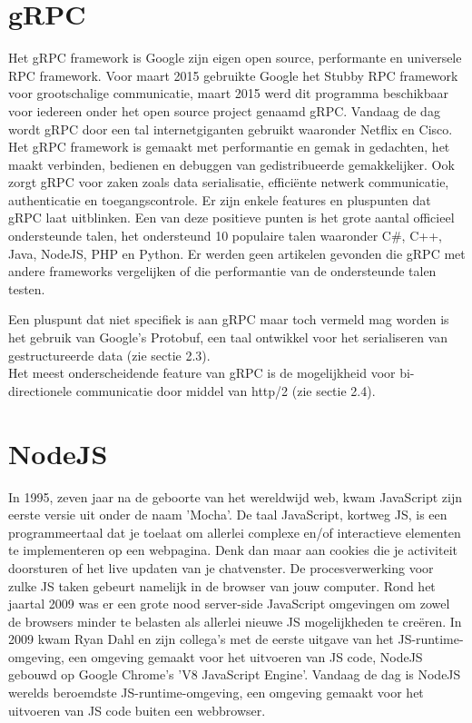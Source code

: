 \section{gRPC}
Het gRPC framework is Google zijn eigen open source, performante en universele RPC framework. Voor maart 2015 gebruikte Google het Stubby RPC framework voor grootschalige communicatie, maart 2015 werd dit programma beschikbaar voor iedereen onder het open source project genaamd gRPC. 
Vandaag de dag wordt gRPC door een tal internetgiganten gebruikt waaronder Netflix en Cisco.
Het gRPC framework is gemaakt met performantie en gemak in gedachten, het maakt verbinden, bedienen en debuggen van gedistribueerde gemakkelijker. Ook zorgt gRPC voor zaken zoals data serialisatie, efficiënte netwerk communicatie, authenticatie en toegangscontrole. Er zijn enkele features en pluspunten dat gRPC laat uitblinken. Een van deze positieve punten is het grote aantal officieel ondersteunde talen, het ondersteund 10 populaire talen waaronder C\#, C++, Java, NodeJS, PHP en Python. Er werden geen artikelen gevonden die gRPC met andere frameworks vergelijken of die performantie van de ondersteunde talen testen.

Een pluspunt dat niet specifiek is aan gRPC maar toch vermeld mag worden is het gebruik van Google's Protobuf, een  taal ontwikkel voor het serialiseren van gestructureerde data (zie sectie 2.3).\\
Het meest onderscheidende feature van gRPC is de mogelijkheid voor bi-directionele communicatie door middel van http/2 (zie sectie 2.4).

\section{NodeJS}
In 1995, zeven jaar na de geboorte van het wereldwijd web, kwam JavaScript zijn eerste versie uit onder de naam 'Mocha'. De taal JavaScript, kortweg JS, is een programmeertaal dat je toelaat om allerlei complexe en/of interactieve elementen te implementeren op een webpagina. Denk dan maar aan cookies die je activiteit doorsturen of het live updaten van je chatvenster. De procesverwerking voor zulke JS taken gebeurt namelijk in de browser van jouw computer. Rond het jaartal 2009 was er een grote nood server-side JavaScript omgevingen om zowel de browsers minder te belasten als allerlei nieuwe JS mogelijkheden te creëren. In 2009 kwam Ryan Dahl en zijn collega's met de eerste uitgave van het JS-runtime-omgeving, een omgeving gemaakt voor het uitvoeren van JS code, NodeJS gebouwd op Google Chrome's 'V8 JavaScript Engine'. Vandaag de dag is NodeJS werelds beroemdste JS-runtime-omgeving, een omgeving gemaakt voor het uitvoeren van JS code buiten een webbrowser.

